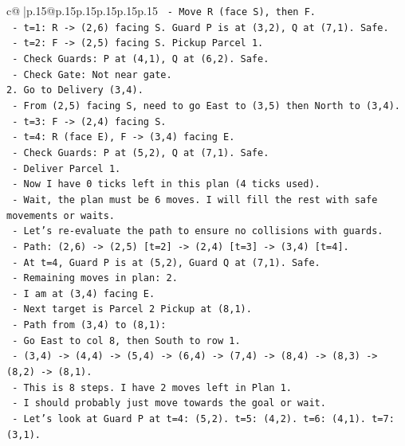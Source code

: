 \documentclass{article}
\begin{document}
{\begin{supertabular}{c@{$\;$}|p{.15\linewidth}@{}p{.15\linewidth}p{.15\linewidth}p{.15\linewidth}p{.15\linewidth}p{.15\linewidth}}
{{{\texttt{   {-} Move R (face S), then F.} \\
\texttt{   {-} t=1: R {-}> (2,6) facing S. Guard P is at (3,2), Q at (7,1). Safe.} \\
\texttt{   {-} t=2: F {-}> (2,5) facing S. Pickup Parcel 1.} \\
\texttt{     {-} Check Guards: P at (4,1), Q at (6,2). Safe.} \\
\texttt{     {-} Check Gate: Not near gate.} \\
\texttt{2. Go to Delivery (3,4).} \\
\texttt{   {-} From (2,5) facing S, need to go East to (3,5) then North to (3,4).} \\
\texttt{   {-} t=3: F {-}> (2,4) facing S.} \\
\texttt{   {-} t=4: R (face E), F {-}> (3,4) facing E.} \\
\texttt{     {-} Check Guards: P at (5,2), Q at (7,1). Safe.} \\
\texttt{     {-} Deliver Parcel 1.} \\
\texttt{     {-} Now I have 0 ticks left in this plan (4 ticks used).} \\
\texttt{     {-} Wait, the plan must be 6 moves. I will fill the rest with safe movements or waits.} \\
\texttt{     {-} Let's re{-}evaluate the path to ensure no collisions with guards.} \\
\texttt{     {-} Path: (2,6) {-}> (2,5) {[}t=2{]} {-}> (2,4) {[}t=3{]} {-}> (3,4) {[}t=4{]}.} \\
\texttt{     {-} At t=4, Guard P is at (5,2), Guard Q at (7,1). Safe.} \\
\texttt{     {-} Remaining moves in plan: 2.} \\
\texttt{     {-} I am at (3,4) facing E.} \\
\texttt{     {-} Next target is Parcel 2 Pickup at (8,1).} \\
\texttt{     {-} Path from (3,4) to (8,1):} \\
\texttt{       {-} Go East to col 8, then South to row 1.} \\
\texttt{       {-} (3,4) {-}> (4,4) {-}> (5,4) {-}> (6,4) {-}> (7,4) {-}> (8,4) {-}> (8,3) {-}> (8,2) {-}> (8,1).} \\
\texttt{       {-} This is 8 steps. I have 2 moves left in Plan 1.} \\
\texttt{       {-} I should probably just move towards the goal or wait.} \\
\texttt{       {-} Let's look at Guard P at t=4: (5,2). t=5: (4,2). t=6: (4,1). t=7: (3,1).} \\
}}}
\end{supertabular}}
\end{document}
